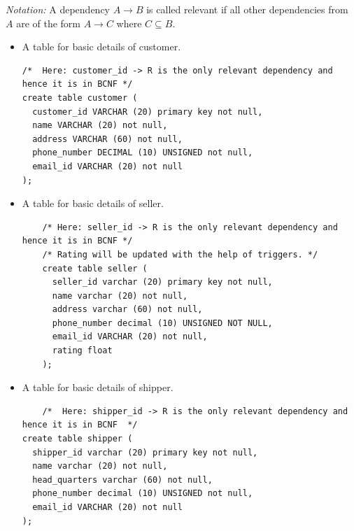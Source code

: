 \documentclass[a4paper,12pt]{article}
\newcommand{\ita}[1]{
    \textit{#1}
}
\begin{document}
\ita{Notation: }A dependency $A \rightarrow B$ is called relevant if all other dependencies from $A$ are of the form $A \rightarrow C$ where $C \subseteq B$.

\begin{itemize}
  \item A table for basic details of customer.
  \begin{verbatim}
/*  Here: customer_id -> R is the only relevant dependency and hence it is in BCNF */
create table customer (
  customer_id VARCHAR (20) primary key not null,
  name VARCHAR (20) not null,
  address VARCHAR (60) not null,
  phone_number DECIMAL (10) UNSIGNED not null,
  email_id VARCHAR (20) not null
);
  \end{verbatim}
  \item A table for basic details of seller.
  \begin{verbatim}
    /* Here: seller_id -> R is the only relevant dependency and hence it is in BCNF */
    /* Rating will be updated with the help of triggers. */
    create table seller (
      seller_id varchar (20) primary key not null,
      name varchar (20) not null,
      address varchar (60) not null,
      phone_number decimal (10) UNSIGNED NOT NULL,
      email_id VARCHAR (20) not null,
      rating float
    );
  \end{verbatim}
  \item A table for basic details of shipper.
  \begin{verbatim}
    /*  Here: shipper_id -> R is the only relevant dependency and hence it is in BCNF  */
create table shipper (
  shipper_id varchar (20) primary key not null,
  name varchar (20) not null,
  head_quarters varchar (60) not null,
  phone_number decimal (10) UNSIGNED not null,
  email_id VARCHAR (20) not null
);


\end{verbatim}
\end{itemize}
\end{document}
